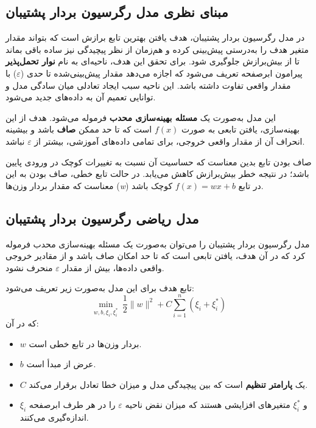 \subsection*{مبنای نظری مدل رگرسیون بردار پشتیبان}

در مدل رگرسیون بردار پشتیبان، هدف یافتن بهترین تابع برازش است که بتواند مقدار متغیر هدف را به‌درستی پیش‌بینی کرده و هم‌زمان از نظر پیچیدگی نیز ساده باقی بماند تا از بیش‌برازش جلوگیری شود. برای تحقق این هدف، ناحیه‌ای به نام \textbf{نوار تحمل‌پذیر} پیرامون ابرصفحه تعریف می‌شود که اجازه می‌دهد مقدار پیش‌بینی‌شده تا حدی (\(\varepsilon\)) با مقدار واقعی تفاوت داشته باشد. این ناحیه سبب ایجاد تعادلی میان سادگی مدل و توانایی تعمیم آن به داده‌های جدید می‌شود.

این مدل به‌صورت یک \textbf{مسئله بهینه‌سازی محدب} فرموله می‌شود. هدف از این بهینه‌سازی، یافتن تابعی به صورت \(f(x)\) است که تا حد ممکن \textbf{صاف} باشد و بیشینه انحراف آن از مقدار واقعی خروجی، برای تمامی داده‌های آموزشی، بیشتر از \(\varepsilon\) نباشد.

صاف بودن تابع بدین معناست که حساسیت آن نسبت به تغییرات کوچک در ورودی پایین باشد؛ در نتیجه خطر بیش‌برازش کاهش می‌یابد. در حالت تابع خطی، صاف بودن به این معناست که مقدار بردار وزن‌ها (\textit{w}) در تابع \(f(x) = wx + b\) کوچک باشد.

\subsection*{مدل ریاضی رگرسیون بردار پشتیبان}

مدل رگرسیون بردار پشتیبان را می‌توان به‌صورت یک مسئله بهینه‌سازی محدب فرموله کرد که در آن هدف، یافتن تابعی است که تا حد امکان صاف باشد و از مقادیر خروجی واقعی داده‌ها، بیش از مقدار \(\varepsilon\) منحرف نشود.

تابع هدف برای این مدل به‌صورت زیر تعریف می‌شود:
\[
\min_{w, b, \xi_i, \xi_i^*} \ \frac{1}{2} \|w\|^2 + C \sum_{i=1}^{n} (\xi_i + \xi_i^*)
\]
که در آن:
\begin{itemize}
	\item \(w\) بردار وزن‌ها در تابع خطی است.
	\item \(b\) عرض از مبدأ است.
	\item \(C\) یک \textbf{پارامتر تنظیم} است که بین پیچیدگی مدل و میزان خطا تعادل برقرار می‌کند.
	\item \(\xi_i\) و \(\xi_i^*\) متغیرهای افزایشی هستند که میزان نقض ناحیه \(\varepsilon\) را در هر طرف ابرصفحه اندازه‌گیری می‌کنند.
\end{itemize}

